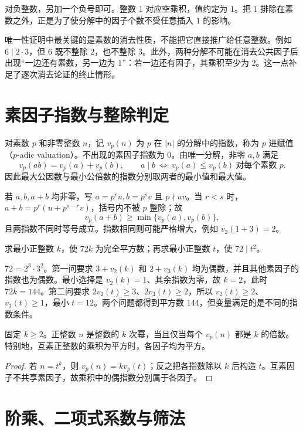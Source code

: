 \documentclass[UTF8,12pt,a4paper,fontset=fandol]{ctexbook}
\begin{document}
对负整数，另加一个负号即可。整数 $1$ 对应空乘积，值约定为 $1$。把 $1$ 排除在素数之外，正是为了使分解中的因子个数不受任意插入 $1$ 的影响。

唯一性证明中最关键的是素数的消去性质，不能把它直接推广给任意整数。例如 $6\mid2\cdot3$，但 $6$ 既不整除 $2$，也不整除 $3$。此外，两种分解不可能在消去公共因子后出现“一边还有素数，另一边为 $1$”：若一边还有因子，其乘积至少为 $2$。这一点补足了逐次消去论证的终止情形。

\section{素因子指数与整除判定}

对素数 $p$ 和非零整数 $n$，记 $v_p(n)$ 为 $p$ 在 $|n|$ 的分解中的指数，称为 $p$ 进赋值（$p$-adic valuation）。不出现的素因子指数为 $0$。由唯一分解，非零 $a,b$ 满足
\[
 v_p(ab)=v_p(a)+v_p(b),\qquad
 a\mid b\ \Longleftrightarrow\ v_p(a)\le v_p(b)\ \text{对每个素数 }p.
\]
因此最大公因数与最小公倍数的指数分别取两者的最小值和最大值。

若 $a,b,a+b$ 均非零，写 $a=p^ru,b=p^sv$ 且 $p\nmid uv$。当 $r<s$ 时，$a+b=p^r(u+p^{s-r}v)$，括号内不被 $p$ 整除；故
\[
 v_p(a+b)\ge\min\{v_p(a),v_p(b)\},
\]
且两指数不同时等号成立。指数相同则可能严格增大，例如 $v_2(1+3)=2$。

\begin{example}[把整除要求转化为指数要求]
求最小正整数 $k$，使 $72k$ 为完全平方数；再求最小正整数 $t$，使 $72\mid t^2$。
\end{example}
\begin{solve}
$72=2^3\cdot3^2$。第一问要求 $3+v_2(k)$ 和 $2+v_3(k)$ 均为偶数，并且其他素因子的指数也为偶数。最小选择是 $v_2(k)=1$、其余指数为零，故 $k=2$，此时 $72k=144$。第二问要求 $2v_2(t)\ge3$、$2v_3(t)\ge2$，所以 $v_2(t)\ge2$、$v_3(t)\ge1$，最小 $t=12$。两个问题都得到平方数 $144$，但变量满足的是不同的指数条件。
\end{solve}

\begin{corollary}
固定 $k\ge2$。正整数 $n$ 是整数的 $k$ 次幂，当且仅当每个 $v_p(n)$ 都是 $k$ 的倍数。特别地，互素正整数的乘积为平方时，各因子均为平方。
\end{corollary}
\begin{proof}
若 $n=t^k$，则 $v_p(n)=kv_p(t)$；反之把各指数除以 $k$ 后构造 $t$。互素因子不共享素因子，故乘积中的偶指数分别属于各因子。
\end{proof}

\section{阶乘、二项式系数与筛法}
\end{document}
